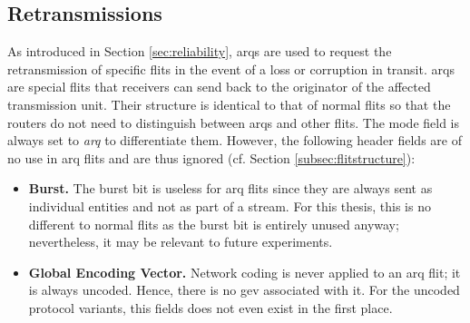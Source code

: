 \subsection{Retransmissions}\label{subsec:arqretransmissions}
As introduced in Section \ref{sec:reliability}, \glspl{arq} are used to request the retransmission of specific flits in the event of a loss or
corruption in transit. \Glspl{arq} are special flits that receivers can send back to the originator of the affected transmission unit. Their structure
is identical to that of normal flits so that the routers do not need to distinguish between \glspl{arq} and other flits. The mode field is always set
to \textit{\gls{arq}} to differentiate them. However, the following header fields are of no use in \gls{arq} flits and are thus ignored (cf. Section
\ref{subsec:flitstructure}):
\begin{itemize}
    \item \textbf{Burst.} The burst bit is useless for \gls{arq} flits since they are always sent as individual entities and not as part of a stream.
        For this thesis, this is no different to normal flits as the burst bit is entirely unused anyway; nevertheless, it may be relevant to future
        experiments.
    \item \textbf{Global Encoding Vector.} Network coding is never applied to an \gls{arq} flit; it is always uncoded. Hence, there is no \gls{gev}
        associated with it. For the uncoded protocol variants, this fields does not even exist in the first place.
\end{itemize}
\vspace{0.5\baselineskip}

